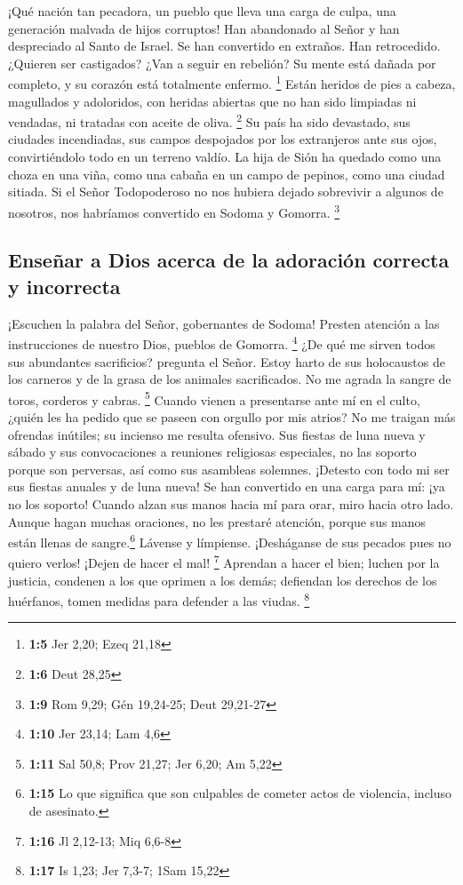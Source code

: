  ¡Qué nación tan pecadora, un pueblo que lleva una carga
de culpa, una generación malvada de hijos corruptos! Han abandonado al
Señor y han despreciado al Santo de Israel. Se han convertido en
extraños. Han retrocedido.  ¿Quieren ser castigados? ¿Van
a seguir en rebelión? Su mente está dañada por completo, y su corazón
está totalmente enfermo. \footnote{\textbf{1:5} Jer 2,20; Ezeq 21,18}
 Están heridos de pies a cabeza, magullados y adoloridos,
con heridas abiertas que no han sido limpiadas ni vendadas, ni tratadas
con aceite de oliva. \footnote{\textbf{1:6} Deut 28,25} 
Su país ha sido devastado, sus ciudades incendiadas, sus campos
despojados por los extranjeros ante sus ojos, convirtiéndolo todo en un
terreno valdío.  La hija de Sión ha quedado como una choza
en una viña, como una cabaña en un campo de pepinos, como una ciudad
sitiada.  Si el Señor Todopoderoso no nos hubiera dejado
sobrevivir a algunos de nosotros, nos habríamos convertido en Sodoma y
Gomorra. \footnote{\textbf{1:9} Rom 9,29; Gén 19,24-25; Deut 29,21-27}

\hypertarget{enseuxf1ar-a-dios-acerca-de-la-adoraciuxf3n-correcta-y-incorrecta}{%
\subsection{Enseñar a Dios acerca de la adoración correcta y
incorrecta}\label{enseuxf1ar-a-dios-acerca-de-la-adoraciuxf3n-correcta-y-incorrecta}}

 ¡Escuchen la palabra del Señor, gobernantes de Sodoma!
Presten atención a las instrucciones de nuestro Dios, pueblos de
Gomorra. \footnote{\textbf{1:10} Jer 23,14; Lam 4,6}  ¿De
qué me sirven todos sus abundantes sacrificios? pregunta el Señor. Estoy
harto de sus holocaustos de los carneros y de la grasa de los animales
sacrificados. No me agrada la sangre de toros, corderos y cabras.
\footnote{\textbf{1:11} Sal 50,8; Prov 21,27; Jer 6,20; Am 5,22}
 Cuando vienen a presentarse ante mí en el culto, ¿quién
les ha pedido que se paseen con orgullo por mis atrios? 
No me traigan más ofrendas inútiles; su incienso me resulta ofensivo.
Sus fiestas de luna nueva y sábado y sus convocaciones a reuniones
religiosas especiales, no las soporto porque son perversas, así como sus
asambleas solemnes.  ¡Detesto con todo mi ser sus fiestas
anuales y de luna nueva! Se han convertido en una carga para mí: ¡ya no
los soporto!  Cuando alzan sus manos hacia mí para orar,
miro hacia otro lado. Aunque hagan muchas oraciones, no les prestaré
atención, porque sus manos están llenas de sangre.\footnote{\textbf{1:15}
  Lo que significa que son culpables de cometer actos de violencia,
  incluso de asesinato.}  Lávense y límpiense.
¡Desháganse de sus pecados pues no quiero verlos! ¡Dejen de hacer el
mal! \footnote{\textbf{1:16} Jl 2,12-13; Miq 6,6-8} 
Aprendan a hacer el bien; luchen por la justicia, condenen a los que
oprimen a los demás; defiendan los derechos de los huérfanos, tomen
medidas para defender a las viudas. \footnote{\textbf{1:17} Is 1,23; Jer
  7,3-7; 1Sam 15,22}

